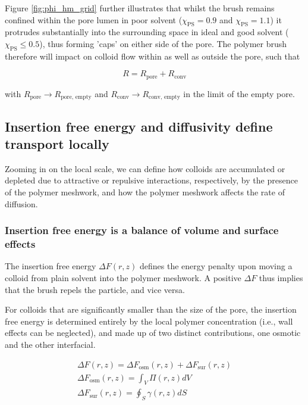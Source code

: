 \documentclass[12pt, a4paper]{article}
\begin{document}
Figure \ref{fig:phi_hm_grid} further illustrates that whilst the brush remains confined within the pore lumen in poor solvent ($\chi_{\text{PS}}=0.9$ and $\chi_{\text{PS}}=1.1$) 
it protrudes substantially into the surrounding space in ideal and good solvent ($\chi_{\text{PS}}\le0.5$), thus forming 'caps' on either side of the pore.  
The polymer brush therefore will impact on colloid flow within as well as outside the pore, such that

\begin{equation}
    R=R_{\text{pore}}+R_{\text{conv}}
    \label{eq:R_tot_tot}
\end{equation}
    
\noindent with $R_{\text{pore}}\rightarrow R_{\text{pore, empty}}$ and $R_{\text{conv}}\rightarrow R_{\text{conv, empty}}$ in the limit of the empty pore. 


\subsection{Insertion free energy and diffusivity define transport locally}

Zooming in on the local scale, we can define how colloids are accumulated or depleted due to attractive or repulsive interactions, respectively, by the presence of the polymer meshwork, 
and how the polymer meshwork affects the rate of diffusion.

\subsubsection{Insertion free energy is a balance of volume and surface effects}

The insertion free energy $\Delta F(r,z)$ defines the energy penalty upon moving a colloid from plain solvent into the polymer meshwork.
A positive $\Delta F$ thus implies that the brush repels the particle, and vice versa.

For colloids that are significantly smaller than the size of the pore, the insertion free energy is determined entirely by the local polymer concentration (i.e., wall effects can be neglected), 
and made up of two distinct contributions, one osmotic and the other interfacial.

\begin{eqnarray}
    \Delta F (r,z)= \Delta F_{\text{osm}}(r,z) + \Delta F_{\text{sur}}(r,z)
    \\
    \Delta F_{\text{osm}}(r,z) = \int_{V} \Pi(r,z) dV
    \\
    \Delta F_{\text{sur}}(r,z) = \oint_{S} \gamma (r,z) dS
    \label{eq:Delta_F}
\end{eqnarray}
\end{document}

